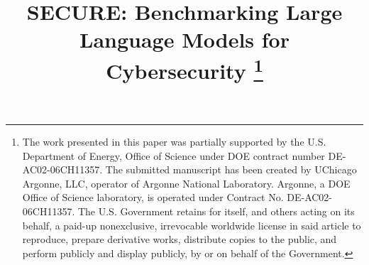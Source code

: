 \documentclass[conference]{IEEEtran}
\begin{document}
\title{SECURE: Benchmarking Large Language Models for Cybersecurity \thanks{ The work presented in this paper was partially supported by the U.S. Department of Energy, Office of Science under DOE contract number DE-AC02-06CH11357. The submitted manuscript has been created by UChicago Argonne, LLC, operator of Argonne National Laboratory. Argonne, a DOE Office of Science laboratory, is operated under Contract No. DE-AC02-06CH11357. The U.S. Government retains for itself, and others acting on its behalf, a paid-up nonexclusive, irrevocable worldwide license in said article to reproduce, prepare derivative works, distribute copies to the public, and perform publicly and display publicly, by or on behalf of the Government. }}

\author{
\and
{}
\and
{}
\and
{}
\and
{}
\and
{}
}
\end{document}
